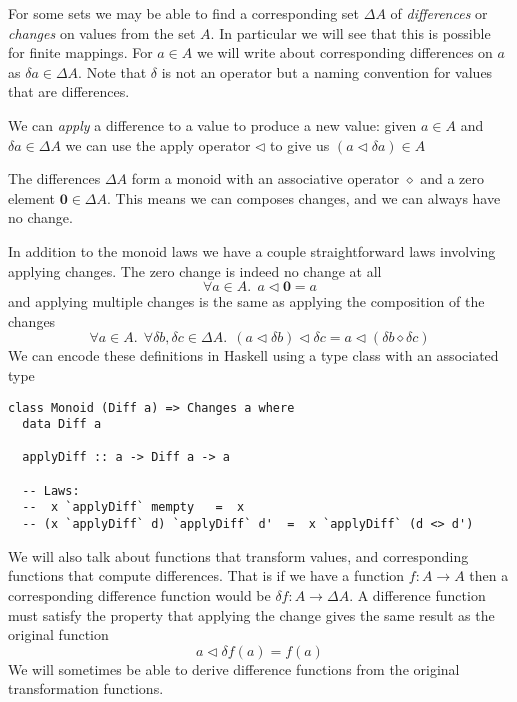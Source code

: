 \documentclass[11pt,a4paper]{article}
\begin{document}
For some sets we may be able to find a corresponding set $\Delta{A}$ of
\emph{differences} or \emph{changes} on values from the set $A$. In particular
we will see that this is possible for finite mappings. For $a \in A$ we will
write about corresponding differences on $a$ as $\delta{a} \in \Delta{A}$.
Note that $\delta$ is not an operator but a naming convention for values that
are differences.

We can \emph{apply} a difference to a value to produce a new value: given
$a \in A$ and $\delta{a} \in \Delta{A}$ we can use the apply operator
$\triangleleft$ to give us $(a \triangleleft \delta{a}) \in A$

The differences $\Delta{A}$ form a monoid with an associative operator
$\diamond$ and a zero element $\mathbf{0} \in \Delta{A}$. This means we can
composes changes, and we can always have no change.

In addition to the monoid laws we have a couple straightforward laws involving
applying changes. The zero change is indeed no change at all
\begin{equation}
  \forall a \in A. ~~ a \triangleleft \mathbf{0} = a
\end{equation}
and applying multiple changes is the same as applying the composition of the
changes
\begin{equation}
\label{eq:apply-compose}
  \forall a \in A. ~~ \forall \delta{b}, \delta{c} \in \Delta{A}. ~~
    (a \triangleleft \delta{b}) \triangleleft \delta{c}
  = a \triangleleft (\delta{b} \diamond \delta{c})
\end{equation}
We can encode these definitions in Haskell using a type class with an associated
type
\begin{verbatim}
class Monoid (Diff a) => Changes a where
  data Diff a

  applyDiff :: a -> Diff a -> a

  -- Laws:
  --  x `applyDiff` mempty   =  x
  -- (x `applyDiff` d) `applyDiff` d'  =  x `applyDiff` (d <> d')
\end{verbatim}

We will also talk about functions that transform values, and corresponding
functions that compute differences. That is if we have a function $f : A \to A$
then a corresponding difference function would be $\delta{f} : A \to \Delta{A}$.
A difference function must satisfy the property that applying the change gives
the same result as the original function
\begin{equation}
  a \triangleleft \delta{f}(a) = f(a)
\end{equation}
We will sometimes be able to derive difference functions from the original
transformation functions.
\end{document}

